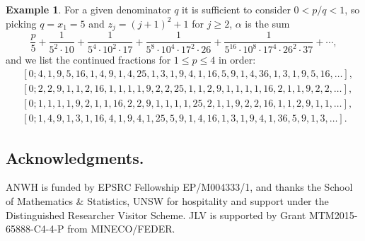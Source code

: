 \documentclass[10pt, a4paper]{amsart}
\numberwithin{equation}{section}
\newcommand\al{{\alpha}}
\theoremstyle{plain}
\theoremstyle{definition}
\newtheorem{exa}[thm]{Example}
\begin{document}
\begin{exa} 
For a given denominator $q$ it is sufficient to consider $0<p/q<1$, so 
picking $q=x_1=5$ and $z_j=(j+1)^2+1$ for $j\geq 2$, $\al$ is the sum 
\[ 
\frac{p}{5} + \frac{1}{5^2 \cdot 10} + \frac{1}{5^4\cdot 10^2\cdot 17}
+ \frac{1}{5^8\cdot 10^4\cdot 17^2\cdot 26}
+ \frac{1}{5^{16}\cdot 10^8\cdot 17^4\cdot 26^2\cdot 37}
+ \cdots,
\] 
and we list the continued fractions for $1\leq p\leq 4$ in order: 
\begin{align*}
& 
[0; 4,1,9,5,16,1,4,9,1,4,25,1,3,1,9,4,1,16,5,9,1,4,36,1,3,1,9,5,16,\ldots],
\\ 
& 
[0; 2,2,9,1,1,2,16,1,1,1,1,9,2,2,25,1,1,2,9,1,1,1,1,16,2,1,1,9,2,2,\ldots],
\\
& 
[0;1,1,1,1,9,2,1,1,16,2,2,9,1,1,1,1,25,2,1,1,9,2,2,16,1,1,2,9,1,1,\ldots ],
\\
& 
[0;1,4,9,1,3,1,16,4,1,9,4,1,25,5,9,1,4,16,1,3,1,9,4,1,36,5,9,1,3,\ldots].
\end{align*} 
\end{exa} 

\subsection*{Acknowledgments.} 
ANWH is funded by EPSRC Fellowship EP/M004333/1, 
and thanks the School of Mathematics \& Statistics, UNSW for 
hospitality and support under the Distinguished Researcher Visitor Scheme.
JLV is supported by Grant MTM2015-65888-C4-4-P from MINECO/FEDER. 
\end{document}
